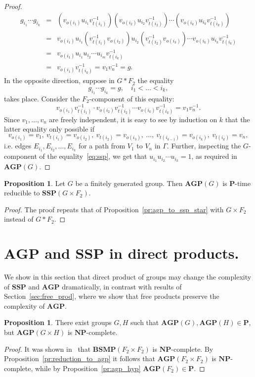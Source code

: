 \documentclass[10pt]{amsart}
\theoremstyle{definition}
\newtheorem{proposition}[theorem]{Proposition}
\def\P{{\mathbf{P}}}
\def\NP{{\mathbf{NP}}}
\def\SSP{{\mathbf{SSP}}}
\def\BSMP{{\mathbf{BSMP}}}
\def\AGP{{\mathbf{AGP}}}
\begin{document}
\begin{proof}
\begin{eqnarray*}
g_{i_1}\cdots g_{i_k}&=&(v_{o(i_1)}u_{i_1}v_{t(i_1)}^{-1})
(v_{o(i_2)}u_{i_2}v_{t(i_2)}^{-1})\cdots (v_{o(i_k)}u_{i_k}v_{t(i_k)}^{-1})\\
&=&v_{o(i_1)}u_{i_1}(v_{t(i_1)}^{-1}
v_{o(i_2)})u_{i_2}(v_{t(i_2)}^{-1}v_{o(i_3)})\cdots v_{o(i_k)}u_{i_k}v_{t(i_k)}^{-1}\\
&=&v_{o(i_1)}u_{i_1}u_{i_2}\cdots u_{i_m}v_{t(i_k)}^{-1}\\
&=&v_{o(i_1)}v_{t(i_k)}^{-1}=v_{1}v_{n}^{-1}=g.
\end{eqnarray*}
In the opposite direction, suppose in $G\ast F_2$ the equality
\begin{equation}\label{eq:ssp}
g_{i_1}\cdots g_{i_k}=g,\quad i_1<\ldots<i_k,
\end{equation}
takes place. Consider the $F_2$-component of this equality:
$$
v_{o(i_1)}v_{t(i_1)}^{-1}\cdot v_{o(i_2)}v_{t(i_2)}^{-1}\cdots v_{o(i_k)}v_{t(i_k)}^{-1}=v_1v_n^{-1}.
$$
Since $v_1,\ldots, v_n$ are freely independent, it is easy to see by induction on $k$ that the latter equality only possible if
$$
v_{o(i_1)}=v_1,\ v_{t(i_1)}=v_{o(i_2)},\ v_{t(i_2)}=v_{o(i_3)},\ \ldots,\ v_{t(i_{k-1})}=v_{o(i_k)},\ v_{t(i_k)}=v_n,
$$
i.e. edges $E_{i_1}, E_{i_2},\ldots, E_{i_k}$ for a path from $V_1$ to $V_n$ in $\Gamma$. Further, inspecting the $G$-component of the equality~\eqref{eq:ssp}, we get that $u_{i_1}u_{i_2}\cdots u_{i_k}=1$, as required in $\AGP(G)$.
\end{proof}

\begin{proposition}\label{pr:agp_to_ssp_cross}
Let $G$ be a finitely generated group. Then $\AGP(G)$ is $\P$-time reducible to $\SSP(G\times F_2)$.
\end{proposition}
\begin{proof}
The proof repeats that of Proposition~\ref{pr:agp_to_ssp_star} with $G\times F_2$ instead of $G\ast F_2$.
\end{proof}

\section{$\AGP$ and $\SSP$ in direct products.}\label{sec:direct_prod}
We show in this section that direct product of groups may change the complexity of $\SSP$ and $\AGP$ dramatically, in contrast with results of Section~\ref{sec:free_prod}, where we show that free products preserve the complexity of $\AGP$.
\begin{proposition}\label{pr:agp_cross}
There exist groups $G,H$ such that $\AGP(G),\AGP(H)\in\P$, but $\AGP(G\times H)$ is $\NP$-complete.
\end{proposition}
\begin{proof}
It was shown in~\cite[Theorem 7.4]{Miasnikov-Nikolaev-Ushakov:2014a} that $\BSMP(F_2\times F_2)$ is $\NP$-complete. By Proposition~\ref{pr:reduction_to_agp} it follows that $\AGP(F_2\times F_2)$ is $\NP$-complete, while by Proposition~\ref{pr:agp_hyp} $\AGP(F_2)\in\P$.
\end{proof}
\end{document}
